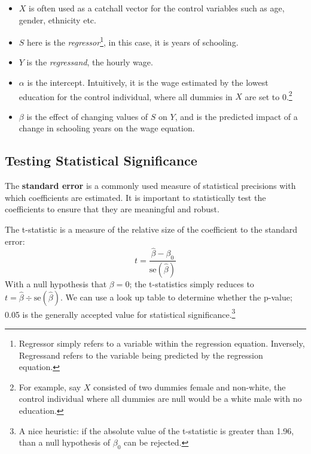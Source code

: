 \documentclass[../Main.tex]{subfiles}
\begin{document}
\begin{refsection}
\begin{itemize}
    \item $X$ is often used as a catchall vector for the control variables such as age,
    gender, ethnicity etc. 
    \item $S$ here is the \textit{regressor}\footnote{Regressor simply refers to
    a variable within the regression equation. Inversely, Regressand refers to
    the variable being predicted by the regression equation.}, in this case, it is years of schooling.
    \item $Y$ is the \textit{regressand}, the hourly wage.
    \item $\alpha$ is the intercept. Intuitively, it is the wage estimated by
    the lowest education for the control individual, where all dummies in $X$
    are set to 0.\footnote{For example, say $X$ consisted of two dummies
    $\text{female}$ and $\text{non-white}$, the control individual where all
    dummies are null would be a white male with no education.} \item $\beta$ is
    the effect of changing values of $S$ on $Y$, and is the
    predicted impact of a change in schooling years on the wage equation.
\end{itemize}

\subsection{Testing Statistical Significance}
    
The \textbf{standard error} is a commonly used measure of statistical precisions
with which coefficients are estimated. It is important to statistically test the
coefficients to ensure that they are meaningful and robust.

The t-statistic is a measure of the relative size of the coefficient to the
standard error: 
\begin{equation}
    t = \frac{\hat{\beta} - \beta_0}{\text{se}(\hat{\beta})}
\end{equation}
With a null hypothesis that $\beta = 0$; the t-statistics simply reduces to $t =
\hat{\beta} \div \text{se}(\hat{\beta})$. We can use a look up table to
determine whether the p-value; 0.05 is the generally accepted value for
statistical significance.\footnote{A nice heuristic: if the absolute value of
the t-statistic is greater than 1.96, than a null hypothesis of $\beta_0$ can be
rejected.}


\end{refsection}
\end{document}
